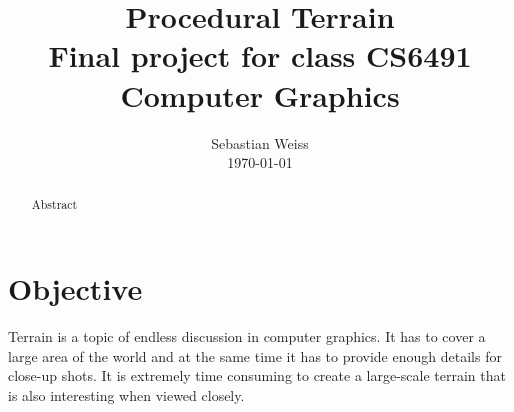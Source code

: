 \documentclass[journal, letterpaper]{IEEEtran}
\begin{document}
\title{Procedural Terrain \\
	{\large Final project for class CS6491 Computer Graphics}}
\author{Sebastian Weiss \\ \today}

\maketitle


\begin{abstract}
	Abstract
\end{abstract}

\section{Objective}
Terrain is a topic of endless discussion in computer graphics. It has to cover a large area of the world and at the same time it has to provide enough details for close-up shots.
It is extremely time consuming to create a large-scale terrain that is also interesting when viewed closely. 
\end{document}
